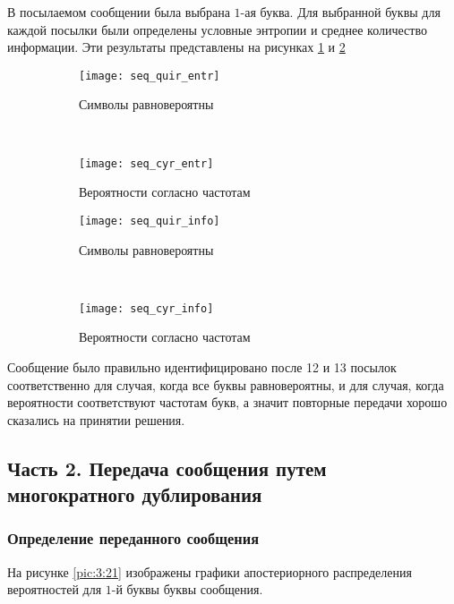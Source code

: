 В посылаемом сообщении была выбрана $1$-ая буква. Для выбранной буквы для каждой посылки были определены условные энтропии и среднее количество информации. Эти результаты представлены на рисунках \ref{pic:3:19} и \ref{pic:3:20}

\begin{figure}[H]
\begin{center}
	\begin{subfigure}[b]{0.45\textwidth}
		\texttt{[image: seq\_quir\_entr]}
		\caption{Символы равновероятны}
	\end{subfigure}
	~
	\begin{subfigure}[b]{0.45\textwidth}
		\texttt{[image: seq\_cyr\_entr]}
		\caption{Вероятности согласно частотам}
	\end{subfigure}
	\caption{}
	\label{pic:3:19}
\end{center}
\end{figure}

\begin{figure}[H]
\begin{center}
	\begin{subfigure}[b]{0.45\textwidth}
		\texttt{[image: seq\_quir\_info]}
		\caption{Символы равновероятны}
	\end{subfigure}
	~
	\begin{subfigure}[b]{0.45\textwidth}
		\texttt{[image: seq\_cyr\_info]}
		\caption{Вероятности согласно частотам}
	\end{subfigure}
	\caption{}
	\label{pic:3:20}
\end{center}
\end{figure}

Сообщение было правильно идентифицировано после 12 и 13 посылок соответственно для случая, когда все буквы равновероятны, и для случая, когда вероятности соответствуют частотам букв, а значит повторные передачи хорошо сказались на принятии решения.

\subsection{Часть 2. Передача сообщения путем многократного дублирования}

\subsubsection{Определение переданного сообщения}

На рисунке \ref{pic:3:21} изображены графики апостериорного распределения вероятностей для $1$-й буквы буквы сообщения.

